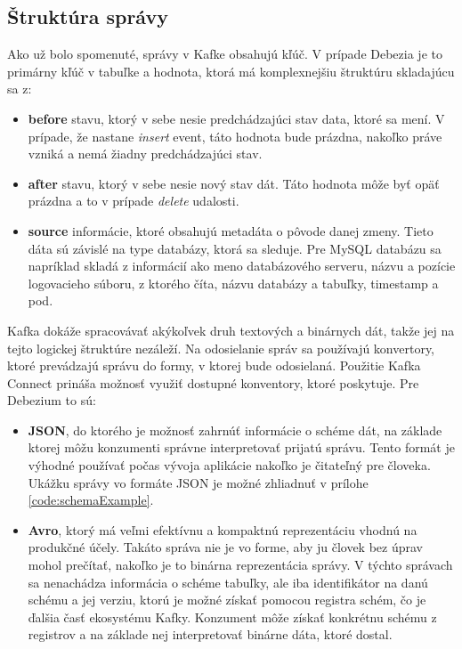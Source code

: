 \subsection{Štruktúra správy} \label{ssec:message_structure}
Ako už bolo spomenuté, správy v Kafke obsahujú kľúč. V prípade Debezia je to primárny kľúč v tabuľke a hodnota, ktorá má komplexnejšiu štruktúru skladajúcu sa z:
\begin{itemize}
\item \textbf{before} stavu, ktorý v sebe nesie predchádzajúci stav data, ktoré sa mení. V prípade, že nastane \textit{insert} event, táto hodnota bude prázdna, nakoľko práve vzniká a nemá žiadny predchádzajúci stav.
\item \textbf{after} stavu, ktorý v sebe nesie nový stav dát. Táto hodnota môže byť opäť prázdna a to v prípade \textit{delete} udalosti.
\item \textbf{source} informácie, ktoré  obsahujú metadáta o pôvode danej zmeny. Tieto dáta sú závislé na type databázy, ktorá sa sleduje. Pre MySQL databázu sa napríklad skladá z informácií ako meno databázového serveru, názvu a pozície logovacieho súboru, z ktorého číta, názvu databázy a tabuľky, timestamp a pod.
\end{itemize}

Kafka dokáže spracovávať akýkoľvek druh textových a binárnych dát, takže jej na tejto logickej štruktúre nezáleží. Na odosielanie správ sa používajú konvertory, ktoré prevádzajú správu do formy, v ktorej bude odosielaná. Použitie Kafka Connect prináša možnosť využiť dostupné konventory, ktoré poskytuje. Pre Debezium to sú:

\begin{itemize}
\item \textbf{JSON}, do ktorého je možnosť zahrnúť informácie o schéme dát, na základe ktorej môžu konzumenti správne interpretovať prijatú správu. Tento formát je výhodné používať počas vývoja aplikácie nakoľko je čitateľný pre človeka. Ukážku správy vo formáte JSON je možné zhliadnuť v prílohe \ref{code:schemaExample}.
\item \textbf{Avro}, ktorý má veľmi efektívnu a kompaktnú reprezentáciu vhodnú na produkčné účely. Takáto správa nie je vo forme, aby ju človek bez úprav mohol prečítať, nakoľko je to binárna reprezentácia správy. V týchto správach sa nenachádza informácia o schéme tabuľky, ale iba identifikátor na danú schému a jej verziu, ktorú je možné získať pomocou registra schém, čo je ďalšia časť ekosystému Kafky. Konzument môže získať konkrétnu schému z registrov a na základe nej interpretovať binárne dáta, ktoré dostal.
\end{itemize}

